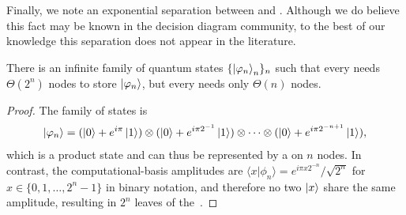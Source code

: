 Finally, we note an exponential separation between \qmdds and \adds.
Although we do believe this fact may be known in the decision diagram community, to the best of our knowledge this separation does not appear in the literature.

\begin{theorem}
	\label{thm:exponential-separation-add-vs-qmdd}
	There is an infinite family of quantum states $\{\ket{\varphi_n}_n\}_{n}$ such that every \add needs $\Theta(2^n)$ nodes to store $\ket{\varphi_n}$, but every \qmdd needs only $\Theta(n)$ nodes.
\end{theorem}
\begin{proof}
	The family of states is
	\begin{align*}
		\ket{\varphi_n}=(\ket{0}+e^{i\pi}\ket{1})\otimes (\ket{0}+e^{i\pi2^{-1}}\ket{1})\otimes \cdots \otimes (\ket{0}+e^{i\pi2^{-n+1}}\ket{1}),
	\end{align*}
	which is a product state and can thus be represented by a \qmdd on $n$ nodes.
	In contrast, the computational-basis amplitudes are $\langle x |\phi_n\rangle = e^{i\pi x2^{-n}}/\sqrt{2^n}$ for $x \in \{0, 1, \dots, 2^n-1\}$ in binary notation, and therefore no two $\ket{x}$ share the same amplitude, resulting in $2^n$ leaves of the~\add.
\end{proof}


